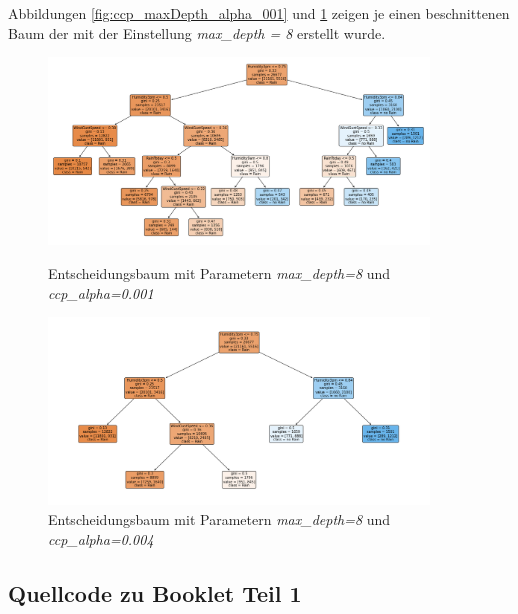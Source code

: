 Abbildungen \ref{fig:ccp_maxDepth_alpha_001} und \ref{fig:ccp_maxDepth_alpha_004} zeigen je einen beschnittenen Baum der mit der Einstellung \emph{max\_depth = 8} erstellt wurde.
\begin{figure}[H]
    \centering
     \begin{minipage}{0.45\textwidth}
        \centering
        \includegraphics[width=0.9\textwidth]{Bilder/ccp_maxDepth_alpha_001.png}
        \caption{Entscheidungsbaum mit Parametern \emph{max\_depth=8} und \emph{ccp\_alpha=0.001}}
        \label{fig:ccp_maxDepth_alpha_001}
    \end{minipage}\hfill
    \begin{minipage}{0.45\textwidth}
        \centering
        \includegraphics[width=0.9\textwidth]{Bilder/ccp_maxdepth_alpha_004.png}
        \caption{Entscheidungsbaum mit Parametern \emph{max\_depth=8} und \emph{ccp\_alpha=0.004}}
        \label{fig:ccp_maxDepth_alpha_004}
    \end{minipage}\hfill
\end{figure}
\pagebreak
\subsection{Quellcode zu Booklet Teil 1}
\pagebreak
